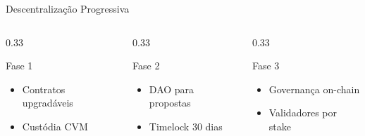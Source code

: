 \documentclass{libs/ufc_format}
\begin{document}
\begin{frame}{Descentralização Progressiva}
    \begin{columns}
        \begin{column}{0.33\textwidth}
            \begin{block}{\small Fase 1}
                \begin{itemize}
                    \item[\tiny$\bullet$] Contratos upgradáveis
                    \item[\tiny$\bullet$] Custódia CVM
                \end{itemize}
            \end{block}
        \end{column}
        \begin{column}{0.33\textwidth}
            \begin{block}{\small Fase 2}
                \begin{itemize}
                    \item[\tiny$\bullet$] DAO para propostas
                    \item[\tiny$\bullet$] Timelock 30 dias
                \end{itemize}
            \end{block}
        \end{column}
        \begin{column}{0.33\textwidth}
            \begin{block}{\small Fase 3}
                \begin{itemize}
                    \item[\tiny$\bullet$] Governança on-chain
                    \item[\tiny$\bullet$] Validadores por stake
                \end{itemize}
            \end{block}
        \end{column}
    \end{columns}
\end{frame}
\end{document}
